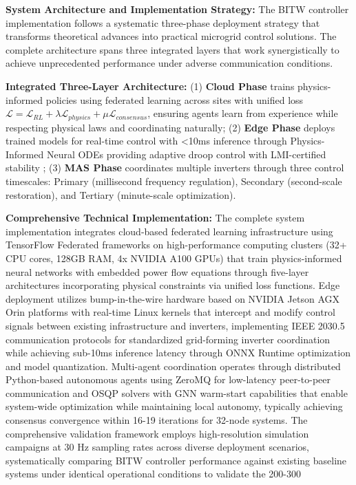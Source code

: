 \documentclass[12pt]{article}
\begin{document}
\textbf{System Architecture and Implementation Strategy:} The BITW controller implementation follows a systematic three-phase deployment strategy that transforms theoretical advances into practical microgrid control solutions. The complete architecture spans three integrated layers that work synergistically to achieve unprecedented performance under adverse communication conditions.

\textbf{Integrated Three-Layer Architecture:} (1) \textbf{Cloud Phase} trains physics-informed policies using federated learning across sites with unified loss $\mathcal{L} = \mathcal{L}_{RL} + \lambda \mathcal{L}_{physics} + \mu \mathcal{L}_{consensus}$, ensuring agents learn from experience while respecting physical laws and coordinating naturally; (2) \textbf{Edge Phase} deploys trained models for real-time control with <10ms inference through Physics-Informed Neural ODEs providing adaptive droop control with LMI-certified stability \cite{our2024theoretical}; (3) \textbf{MAS Phase} coordinates multiple inverters through three control timescales: Primary (millisecond frequency regulation), Secondary (second-scale restoration), and Tertiary (minute-scale optimization).

\textbf{Comprehensive Technical Implementation:} The complete system implementation integrates cloud-based federated learning infrastructure using TensorFlow Federated frameworks on high-performance computing clusters (32+ CPU cores, 128GB RAM, 4x NVIDIA A100 GPUs) that train physics-informed neural networks with embedded power flow equations through five-layer architectures incorporating physical constraints via unified loss functions. Edge deployment utilizes bump-in-the-wire hardware based on NVIDIA Jetson AGX Orin platforms with real-time Linux kernels that intercept and modify control signals between existing infrastructure and inverters, implementing IEEE 2030.5 communication protocols for standardized grid-forming inverter coordination while achieving sub-10ms inference latency through ONNX Runtime optimization and model quantization. Multi-agent coordination operates through distributed Python-based autonomous agents using ZeroMQ for low-latency peer-to-peer communication and OSQP solvers with GNN warm-start capabilities that enable system-wide optimization while maintaining local autonomy, typically achieving consensus convergence within 16-19 iterations for 32-node systems. The comprehensive validation framework employs high-resolution simulation campaigns at 30 Hz sampling rates across diverse deployment scenarios, systematically comparing BITW controller performance against existing baseline systems under identical operational conditions to validate the 200-300%
\end{document}
